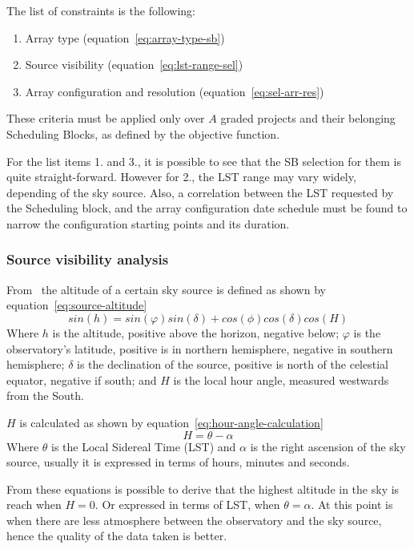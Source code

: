 \begin{description}
The list of constraints is the following:
\begin{enumerate}
\item Array type (equation~\ref{eq:array-type-sb})
\item Source visibility (equation~\ref{eq:lst-range-sel})
\item Array configuration and resolution (equation~\ref{eq:sel-arr-res})
\end{enumerate}
These criteria must be applied only over $A$ graded projects and their belonging Scheduling Blocks, as defined by the objective function.

For the list items 1. and 3., it is possible to see that the SB selection for them is quite straight-forward. However for 2., the LST range may vary widely, depending of the sky source. Also, a correlation between the LST requested by the Scheduling block, and the array configuration date schedule must be found to narrow the configuration starting points and its duration.

\subsubsection{Source visibility analysis}
From~\cite{meeus98} the altitude of a certain sky source is defined as shown by equation~\ref{eq:source-altitude}
\begin{equation}
\label{eq:source-altitude}
sin(h) = sin(\varphi) sin(\delta) + cos(\phi) cos(\delta) cos(H)
\end{equation}
Where $h$ is the altitude, positive above the horizon, negative below; $\varphi$ is the observatory's latitude, positive is in northern hemisphere, negative in southern hemisphere; $\delta$ is the declination of the source, positive is north of the celestial equator, negative if south; and $H$ is the local hour angle, measured westwards from the South.

$H$ is calculated as shown by equation~\ref{eq:hour-angle-calculation}
\begin{equation}
\label{eq:hour-angle-calculation}
H = \theta - \alpha
\end{equation}
Where $\theta$ is the Local Sidereal Time (LST) and $\alpha$ is the right ascension of the sky source, usually it is expressed in terms of hours, minutes and seconds.

From these equations is possible to derive that the highest altitude in the sky is reach when $H = 0$. Or expressed in terms of LST, when $\theta = \alpha$. At this point is when there are less atmosphere between the observatory and the sky source, hence the quality of the data taken is better.


\end{description}
